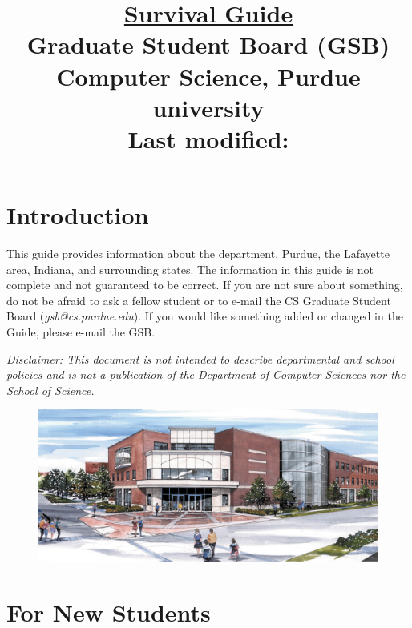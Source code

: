 \documentclass[letterpaper,10pt]{article}
\begin{document}
\date{}

\title{\huge \underline{Survival Guide} \\
Graduate Student Board (GSB) \\
Computer Science, Purdue university \\
\vspace{\baselineskip}
\large Last modified: \filemodprintdate{\jobname}}

\maketitle

\section{Introduction}
This guide provides information about the department, Purdue, the Lafayette area, Indiana, and surrounding states. The information in this guide is not complete and not guaranteed to be correct. If you are not sure about something, do not be afraid to ask a fellow student or to e-mail the CS Graduate Student Board (\emph{gsb@cs.purdue.edu}). If you would like something added or changed in the Guide, please e-mail the GSB.

\textit{Disclaimer: This document is not intended to describe departmental and school policies and is not a publication of the Department of Computer Sciences nor the School of Science.}

\begin{figure}[h]
\includegraphics[width=1.0\textwidth]{lawson.png}
\end{figure}

\pagebreak
\tableofcontents

\pagebreak

\pagebreak


\pagebreak
\section{For New Students}





\end{document}

